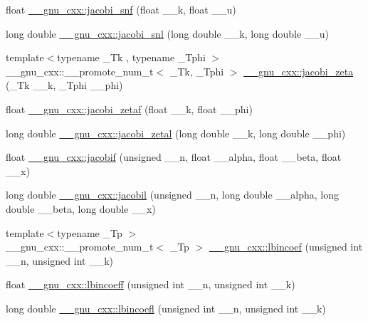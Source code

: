 \begin{DoxyCompactItemize}
\item 
float \hyperlink{group__gnu__math__spec__func_ga5981245b7343da6e21d445bb01fdba9c}{\+\_\+\+\_\+gnu\+\_\+cxx\+::jacobi\+\_\+snf} (float \+\_\+\+\_\+k, float \+\_\+\+\_\+u)
\item 
long double \hyperlink{group__gnu__math__spec__func_ga1c13539e3b051a07b1c28aa8a0aeb1b4}{\+\_\+\+\_\+gnu\+\_\+cxx\+::jacobi\+\_\+snl} (long double \+\_\+\+\_\+k, long double \+\_\+\+\_\+u)
\item 
{\footnotesize template$<$typename \+\_\+\+Tk , typename \+\_\+\+Tphi $>$ }\\\+\_\+\+\_\+gnu\+\_\+cxx\+::\+\_\+\+\_\+promote\+\_\+num\+\_\+t$<$ \+\_\+\+Tk, \+\_\+\+Tphi $>$ \hyperlink{group__gnu__math__spec__func_gae22f0fc0fa1cac3bd0d3b3a4b2c33e7e}{\+\_\+\+\_\+gnu\+\_\+cxx\+::jacobi\+\_\+zeta} (\+\_\+\+Tk \+\_\+\+\_\+k, \+\_\+\+Tphi \+\_\+\+\_\+phi)
\item 
float \hyperlink{group__gnu__math__spec__func_gaedb6b352331c67b9dea73660e2045668}{\+\_\+\+\_\+gnu\+\_\+cxx\+::jacobi\+\_\+zetaf} (float \+\_\+\+\_\+k, float \+\_\+\+\_\+phi)
\item 
long double \hyperlink{group__gnu__math__spec__func_ga9db158df9459aa12c840724338753913}{\+\_\+\+\_\+gnu\+\_\+cxx\+::jacobi\+\_\+zetal} (long double \+\_\+\+\_\+k, long double \+\_\+\+\_\+phi)
\item 
float \hyperlink{group__gnu__math__spec__func_ga450db12e06d6993d169afab5b3f6d0b8}{\+\_\+\+\_\+gnu\+\_\+cxx\+::jacobif} (unsigned \+\_\+\+\_\+n, float \+\_\+\+\_\+alpha, float \+\_\+\+\_\+beta, float \+\_\+\+\_\+x)
\item 
long double \hyperlink{group__gnu__math__spec__func_ga2898a5ebf451eaf259ecfcdd171aa72b}{\+\_\+\+\_\+gnu\+\_\+cxx\+::jacobil} (unsigned \+\_\+\+\_\+n, long double \+\_\+\+\_\+alpha, long double \+\_\+\+\_\+beta, long double \+\_\+\+\_\+x)
\item 
{\footnotesize template$<$typename \+\_\+\+Tp $>$ }\\\+\_\+\+\_\+gnu\+\_\+cxx\+::\+\_\+\+\_\+promote\+\_\+num\+\_\+t$<$ \+\_\+\+Tp $>$ \hyperlink{group__gnu__math__spec__func_gab3eab510cd484f6ec75e968b1d98b818}{\+\_\+\+\_\+gnu\+\_\+cxx\+::lbincoef} (unsigned int \+\_\+\+\_\+n, unsigned int \+\_\+\+\_\+k)
\item 
float \hyperlink{group__gnu__math__spec__func_gab48439faacd87f02d088a04e7cee0853}{\+\_\+\+\_\+gnu\+\_\+cxx\+::lbincoeff} (unsigned int \+\_\+\+\_\+n, unsigned int \+\_\+\+\_\+k)
\item 
long double \hyperlink{group__gnu__math__spec__func_gab5b5d92a2a522aaef999106f5d602163}{\+\_\+\+\_\+gnu\+\_\+cxx\+::lbincoefl} (unsigned int \+\_\+\+\_\+n, unsigned int \+\_\+\+\_\+k)

\end{DoxyCompactItemize}

